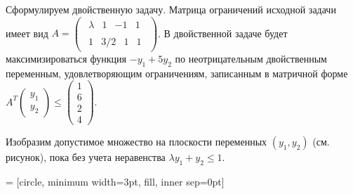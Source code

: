\begin{solution}
Сформулируем двойственную задачу. Матрица ограничений исходной задачи имеет вид $A=\left(\begin{array}{c} {\begin{array}{cccc} {\lambda } & {1} & {-1} & {1} \end{array}} \\ {\begin{array}{cccc} {1} & {3/2} & {1} & {1} \end{array}} \end{array}\right)$. В двойственной задаче будет максимизироваться функция $-y_{1} +5y_{2} $ по неотрицательным двойственным переменным, удовлетворяющим ограничениям, записанным в матричной форме $A^{T} \left(\begin{array}{c} {y_{1} } \\ {y_{2} } \end{array}\right)\le \left(\begin{array}{c} {1} \\ {6} \\ {2} \\ {4} \end{array}\right)$.

Изобразим допустимое множество на плоскости переменных $(y_{1} ,y_{2} )$ (см. рисунок), пока без учета неравенства $\lambda y_{1} +y_{2} \le 1$.



 = [circle, minimum width=3pt, fill, inner sep=0pt]


\end{solution}

